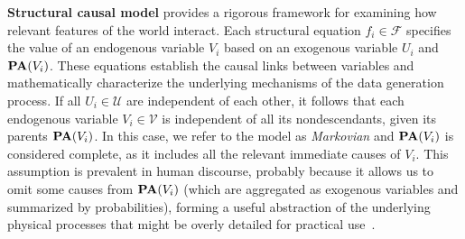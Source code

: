 \documentclass[10pt]{article} %
\theoremstyle{definition}
\begin{document}
\textbf{Structural causal model} provides a rigorous framework for examining how relevant features of the world interact. Each structural equation $f_i \in \mathcal{F}$  specifies the value of an endogenous variable $V_i$ based on an exogenous variable $U_i$ and $\mbox{\textbf{PA}}(V_i)$. These equations establish the causal links between variables and mathematically characterize the underlying mechanisms of the data generation process. If all $U_i\in \mathcal{U}$ are independent of each other, it follows that each endogenous variable $V_i \in \mathcal{V}$ is independent of all its nondescendants, given its parents $\mbox{\textbf{PA}}(V_i)$. In this case, we refer to the model as \emph{Markovian} and $\mbox{\textbf{PA}}(V_i)$ is considered complete, as it includes all the relevant immediate causes of $V_i$. This assumption is prevalent in human discourse, probably because it allows us to omit some causes from $\mbox{\textbf{PA}}(V_i)$ (which are aggregated as exogenous variables and summarized by probabilities), forming a useful abstraction of the underlying physical processes that might be overly detailed for practical use~\citep[Chapter~2]{pearlCausality2009}.
\end{document}
